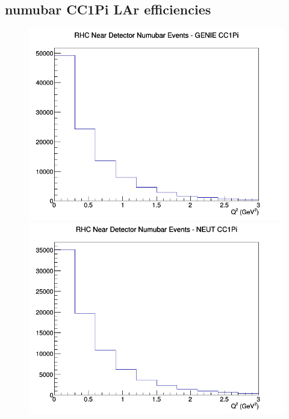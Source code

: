 \documentclass[12pt]{article}
\begin{document}
\subsection{numubar CC1Pi LAr efficiencies}
\begin{figure}[h]
\includegraphics[width=\linewidth]{eff_Q2/LAr/CC1Pi_RHC_ND_numubar_Q2_GENIE.png}
\endminipage
{}
\includegraphics[width=\linewidth]{eff_Q2/LAr/CC1Pi_RHC_ND_numubar_Q2_NEUT.png}
\endminipage
{}

\end{figure}
\end{document}
